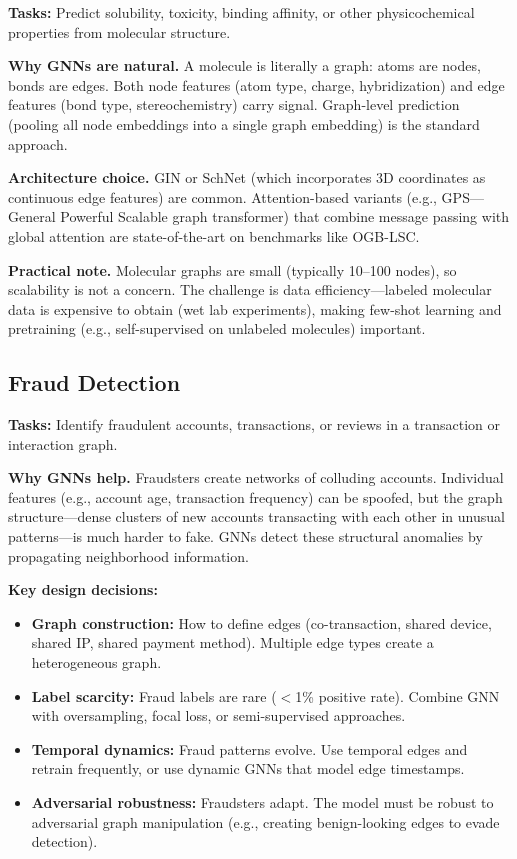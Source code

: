 \textbf{Tasks:} Predict solubility, toxicity, binding affinity, or other physicochemical properties from molecular structure.

\textbf{Why GNNs are natural.} A molecule is literally a graph: atoms are nodes, bonds are edges. Both node features (atom type, charge, hybridization) and edge features (bond type, stereochemistry) carry signal. Graph-level prediction (pooling all node embeddings into a single graph embedding) is the standard approach.

\textbf{Architecture choice.} GIN or SchNet (which incorporates 3D coordinates as continuous edge features) are common. Attention-based variants (e.g., GPS---General Powerful Scalable graph transformer) that combine message passing with global attention are state-of-the-art on benchmarks like OGB-LSC.

\textbf{Practical note.} Molecular graphs are small (typically 10--100 nodes), so scalability is not a concern. The challenge is data efficiency---labeled molecular data is expensive to obtain (wet lab experiments), making few-shot learning and pretraining (e.g., self-supervised on unlabeled molecules) important.

\subsection{Fraud Detection}

\textbf{Tasks:} Identify fraudulent accounts, transactions, or reviews in a transaction or interaction graph.

\textbf{Why GNNs help.} Fraudsters create networks of colluding accounts. Individual features (e.g., account age, transaction frequency) can be spoofed, but the graph structure---dense clusters of new accounts transacting with each other in unusual patterns---is much harder to fake. GNNs detect these structural anomalies by propagating neighborhood information.

\textbf{Key design decisions:}
\begin{itemize}
    \item \textbf{Graph construction:} How to define edges (co-transaction, shared device, shared IP, shared payment method). Multiple edge types create a heterogeneous graph.
    \item \textbf{Label scarcity:} Fraud labels are rare ($<$1\% positive rate). Combine GNN with oversampling, focal loss, or semi-supervised approaches.
    \item \textbf{Temporal dynamics:} Fraud patterns evolve. Use temporal edges and retrain frequently, or use dynamic GNNs that model edge timestamps.
    \item \textbf{Adversarial robustness:} Fraudsters adapt. The model must be robust to adversarial graph manipulation (e.g., creating benign-looking edges to evade detection).
\end{itemize}

